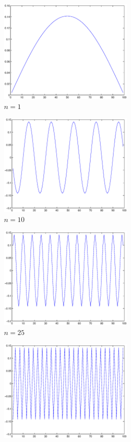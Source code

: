 \documentclass[paper=a4, fontsize=11pt]{scrartcl} %
\numberwithin{equation}{section} %
\numberwithin{figure}{section} %
\numberwithin{table}{section} %
\begin{document}
\begin{CJK*}{UTF8}{gbsn}
\begin{figure}[H]
\centering
\begin{subfigure}{70mm}
  \centering
  \includegraphics[width=65mm]{figure-1-2-2.eps}
  \caption{$n=1$}
  \label{fig:sub1}
\end{subfigure}
\begin{subfigure}{70mm}
  \centering
  \includegraphics[width=65mm]{figure-1-2-3.eps}
  \caption{$n=10$}
  \label{fig:sub2}
\end{subfigure}
\begin{subfigure}{70mm}
  \centering
  \includegraphics[width=65mm]{figure-1-2-4.eps}
  \caption{$n=25$}
  \label{fig:sub1}
\end{subfigure}
\begin{subfigure}{70mm}
  \centering
  \includegraphics[width=65mm]{figure-1-2-5.eps}

\end{subfigure}
\end{figure}
\end{CJK*}
\end{document}
